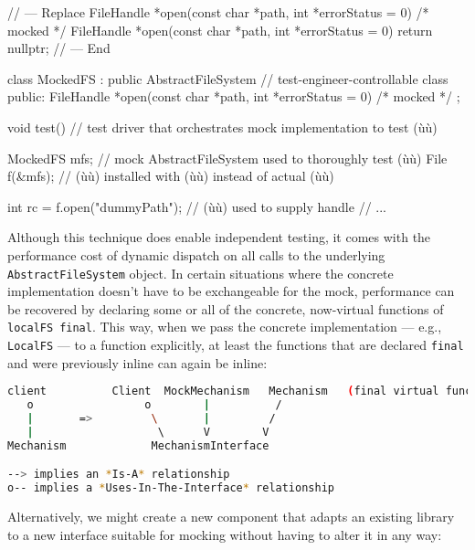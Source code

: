{{\begin{emcppshiddenlisting}[emcppsbatch=e6]
// --- Replace
    FileHandle *open(const char *path, int *errorStatus = 0) { /* mocked */ }
    FileHandle *open(const char *path, int *errorStatus = 0) { return nullptr; }
// --- End
\end{emcppshiddenlisting}
\begin{emcppslisting}[emcppsbatch=e6]
class MockedFS : public AbstractFileSystem  // test-engineer-controllable class
{
public:
    FileHandle *open(const char *path, int *errorStatus = 0) { /* mocked */ }
};

void test()  // test driver that orchestrates mock implementation to test (ù{}ù)
{
    MockedFS mfs;  // mock AbstractFileSystem used to thoroughly test (ù{}ù)
    File f(&mfs);  // (ù{}ù) installed with (ù{}ù) instead of actual (ù{}ù)

    int rc = f.open("dummyPath");  // (ù{}ù) used to supply handle
    // ...
}
\end{emcppslisting}
    

\noindent Although this technique does enable independent testing, it comes with
the performance cost of dynamic dispatch on all calls to the underlying
\lstinline!AbstractFileSystem! object. In certain situations where the
concrete implementation doesn't have to be exchangeable for the mock,
performance can be recovered by declaring some or all of the concrete,
now-virtual functions of \lstinline!localFS!~\lstinline!final!. This way, when
we pass the concrete implementation --- e.g., \lstinline!LocalFS! --- to a
function explicitly, at least the functions that are declared
\lstinline!final! and were previously inline can again be inline:

\begin{lstlisting}[language=bash,style=plain]
client          Client  MockMechanism   Mechanism   (final virtual functions)
   o                 o        |          /
   |       =>         \       |         /
   |                   \      V        V
Mechanism             MechanismInterface

--> implies an *Is-A* relationship
o-- implies a *Uses-In-The-Interface* relationship
\end{lstlisting}
    

\noindent Alternatively, we might create a new component that adapts an existing
library to a new interface suitable for mocking without having to alter
it in any way:

}}
